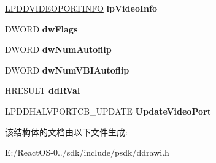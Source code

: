 \begin{DoxyCompactItemize}
\hyperlink{struct___d_d_v_i_d_e_o_p_o_r_t_i_n_f_o}{L\+P\+D\+D\+V\+I\+D\+E\+O\+P\+O\+R\+T\+I\+N\+FO} {\bfseries lp\+Video\+Info}
\item 
\mbox{\label{struct___d_d_h_a_l___u_p_d_a_t_e_v_p_o_r_t_d_a_t_a_a210928e0c9a27c9d2a9422226e8979bc}} 
D\+W\+O\+RD {\bfseries dw\+Flags}
\item 
\mbox{\label{struct___d_d_h_a_l___u_p_d_a_t_e_v_p_o_r_t_d_a_t_a_a674c13f0208ed94f4180384f8bbc277d}} 
D\+W\+O\+RD {\bfseries dw\+Num\+Autoflip}
\item 
\mbox{\label{struct___d_d_h_a_l___u_p_d_a_t_e_v_p_o_r_t_d_a_t_a_a627a2d91216b04b589a8601f1eb61840}} 
D\+W\+O\+RD {\bfseries dw\+Num\+V\+B\+I\+Autoflip}
\item 
\mbox{\label{struct___d_d_h_a_l___u_p_d_a_t_e_v_p_o_r_t_d_a_t_a_a5cadde826d679a3822940756c7830354}} 
H\+R\+E\+S\+U\+LT {\bfseries dd\+R\+Val}
\item 
\mbox{\label{struct___d_d_h_a_l___u_p_d_a_t_e_v_p_o_r_t_d_a_t_a_a10cf02cf378592169f7412a586ec5192}} 
L\+P\+D\+D\+H\+A\+L\+V\+P\+O\+R\+T\+C\+B\+\_\+\+U\+P\+D\+A\+TE {\bfseries Update\+Video\+Port}
\end{DoxyCompactItemize}


该结构体的文档由以下文件生成\+:\begin{DoxyCompactItemize}
\item 
E\+:/\+React\+O\+S-\/0../sdk/include/psdk/ddrawi.\+h\end{DoxyCompactItemize}
